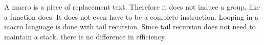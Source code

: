 A macro is a piece of replacement text. Therefore it does not induce a
group, like a function does. It does not even have to be a complete
instruction.  Looping in a macro language is done with tail
recursion. Since tail recursion does not need to maintain a stack,
there is no difference in efficiency.

